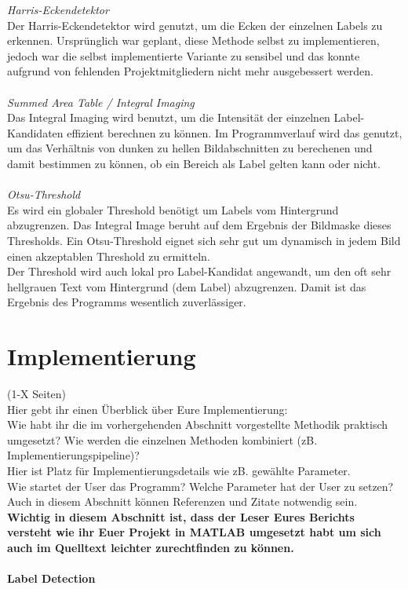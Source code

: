 \documentclass[paper=A4, deutsch]{scrartcl}
\begin{document}
\textit{Harris-Eckendetektor} \cite{harris}\\
Der Harris-Eckendetektor wird genutzt, um die Ecken der einzelnen Labels zu erkennen.
Ursprünglich war geplant, diese Methode selbst zu implementieren, jedoch war die selbst implementierte Variante zu sensibel und das konnte aufgrund von fehlenden Projektmitgliedern nicht mehr ausgebessert werden.\\
\\

\textit{Summed Area Table / Integral Imaging} \cite{integralimg}\\
Das Integral Imaging wird benutzt, um die Intensität der einzelnen Label-Kandidaten effizient berechnen zu können. Im Programmverlauf wird das genutzt, um das Verhältnis von dunken zu hellen Bildabschnitten zu berechenen und damit bestimmen zu können, ob ein Bereich als Label gelten kann oder nicht.\\
\\

\textit{Otsu-Threshold} \cite{otsu}\\
Es wird ein globaler Threshold benötigt um Labels vom Hintergrund abzugrenzen. Das Integral Image beruht auf dem Ergebnis der Bildmaske dieses Thresholds. Ein Otsu-Threshold eignet sich sehr gut um dynamisch in jedem Bild einen akzeptablen Threshold zu ermitteln.\\
Der Threshold wird auch lokal pro Label-Kandidat angewandt, um den oft sehr hellgrauen Text vom Hintergrund (dem Label) abzugrenzen. Damit ist das Ergebnis des Programms wesentlich zuverlässiger.



\section{Implementierung}
(1-X Seiten)\\
Hier gebt ihr einen Überblick über Eure Implementierung:\\
Wie habt ihr die im vorhergehenden Abschnitt vorgestellte Methodik praktisch umgesetzt? Wie werden die einzelnen Methoden kombiniert (zB. Implementierungspipeline)?\\
Hier ist Platz für Implementierungsdetails wie zB. gewählte Parameter. \\
Wie startet der User das Programm? Welche Parameter hat der User zu setzen?\\
Auch in diesem Abschnitt können Referenzen und Zitate notwendig sein.\\
\textbf{Wichtig in diesem Abschnitt ist, dass der Leser Eures Berichts versteht wie ihr Euer Projekt in MATLAB umgesetzt habt um sich auch im Quelltext leichter zurechtfinden zu können.}
\\
\\
\textbf{Label Detection}
\end{document}
